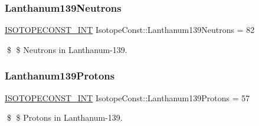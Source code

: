 \subsubsection{\texorpdfstring{Lanthanum139\+Neutrons}{Lanthanum139Neutrons}}
{\footnotesize\ttfamily \mbox{\hyperlink{group___isotope_const-_macros_ga5f18360b3e99483a35c32d789e62621c}{I\+S\+O\+T\+O\+P\+E\+C\+O\+N\+S\+T\+\_\+\+I\+NT}} Isotope\+Const\+::\+Lanthanum139\+Neutrons = 82}

\$ \$ Neutrons in Lanthanum-\/139. \mbox{\label{group___isotope_const-_lanthanum-_la139_ga2a2989e1ffbf10a8d621f41aae403306}} 
\subsubsection{\texorpdfstring{Lanthanum139\+Protons}{Lanthanum139Protons}}
{\footnotesize\ttfamily \mbox{\hyperlink{group___isotope_const-_macros_ga5f18360b3e99483a35c32d789e62621c}{I\+S\+O\+T\+O\+P\+E\+C\+O\+N\+S\+T\+\_\+\+I\+NT}} Isotope\+Const\+::\+Lanthanum139\+Protons = 57}

\$ \$ Protons in Lanthanum-\/139. 